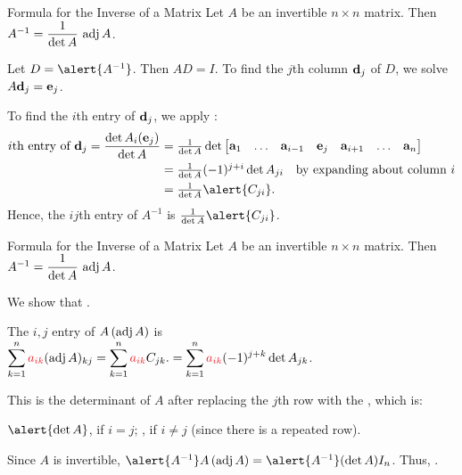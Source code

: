 \documentclass[xcolor=dvipsnames,aspectratio=169,t]{beamer}
\begin{document}
\begin{frame}{Formula for the Inverse of a Matrix}
  \bbox
    Let $A$ be an invertible $n\times n$ matrix.
    Then $A^{-1} = \displaystyle\frac{1}{\det A} \  \mbox{adj}\, A$.
  \ebox
  
  \pause
  
  Let $D=\alert{A^{-1}}$.  Then $AD=I$.  To find the $j$th column $\mathbf{d}_j$ of $D$, we solve $A\mathbf{d}_j=\mathbf{e}_j$.
  
  To find the $i$th entry of $\mathbf{d}_j$, we apply :
  \begin{align*}
    \text{$i$th entry of $\d_j$} 
    = \frac{\det A_i(\e_j)}{\det A}
    &= \textstyle \frac{1}{\det A} \det \begin{bmatrix} \a_1 & \ldots & \a_{i-1} & \e_j & \a_{i+1} & \ldots & \a_n \end{bmatrix} \\
    &= \textstyle \frac{1}{\det A} (-1)^{j+i} \det A_{ji} \quad \text{by expanding about column $i$}\\
    &= \textstyle \frac{1}{\det A} \alert{C_{ji}}.
  \end{align*}
  Hence, the $ij$th entry of $A^{-1}$ is $\textstyle \frac{1}{\det A} \alert{C_{ji}}$.
\end{frame}


\begin{frame}{Formula for the Inverse of a Matrix}
  \bbox
    Let $A$ be an invertible $n\times n$ matrix.
    Then $A^{-1} = \displaystyle\frac{1}{\det A} \  \mbox{adj}\, A$.
  \ebox
  
  \pause
  
  We show that .
  
  The $i,j$ entry of $A \, (\mbox{adj}\, A)$ is 
  $\displaystyle
    \sum_{k=1}^n \red{a_{ik}} (\adj A)_{kj}
   =\sum_{k=1}^n \red{a_{ik}} C_{jk}.
   =\sum_{k=1}^n \red{a_{ik}} (-1)^{j+k} \det A_{jk}$.
  \medskip
  
  \pause
  This is the determinant of $A$ after replacing the $j$th row with the , which is:
  \medskip
  
  \hspace*{6em} $\alert{\det A}$, if $i=j$; \qquad {}, if $i\ne j$ (since there is a repeated row).
  \vspace*{1.5em}
  
  \pause
  Since $A$ is invertible, $\alert{A^{-1}} A \, (\adj A) = \alert{A^{-1}} (\det A) I_n$.
  Thus, .
\end{frame}
\end{document}
